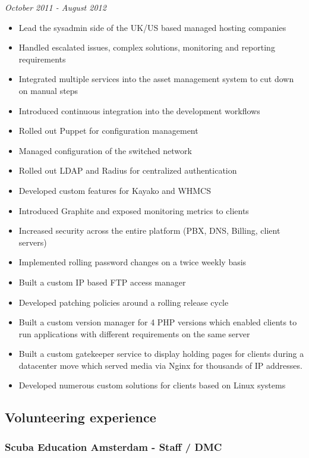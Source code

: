 \emph{October 2011 - August 2012}

\begin{itemize}
\tightlist
\item
  Lead the sysadmin side of the UK/US based managed hosting companies
\item
  Handled escalated issues, complex solutions, monitoring and reporting
  requirements
\item
  Integrated multiple services into the asset management system to cut
  down on manual steps
\item
  Introduced continuous integration into the development workflows
\item
  Rolled out Puppet for configuration management
\item
  Managed configuration of the switched network
\item
  Rolled out LDAP and Radius for centralized authentication
\item
  Developed custom features for Kayako and WHMCS
\item
  Introduced Graphite and exposed monitoring metrics to clients
\item
  Increased security across the entire platform (PBX, DNS, Billing,
  client servers)
\item
  Implemented rolling password changes on a twice weekly basis
\item
  Built a custom IP based FTP access manager
\item
  Developed patching policies around a rolling release cycle
\item
  Built a custom version manager for 4 PHP versions which enabled
  clients to run applications with different requirements on the same
  server
\item
  Built a custom gatekeeper service to display holding pages for clients
  during a datacenter move which served media via Nginx for thousands of
  IP addresses.
\item
  Developed numerous custom solutions for clients based on Linux systems
\end{itemize}

\subsection{Volunteering experience}\label{volunteering-experience}

\subsubsection{Scuba Education Amsterdam - Staff /
DMC}\label{scuba-education-amsterdam---staff-dmc}

